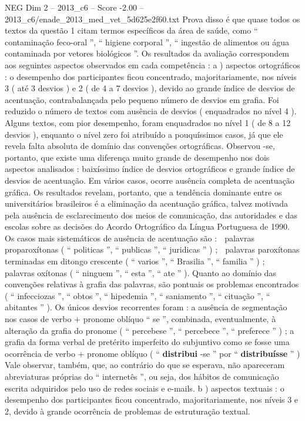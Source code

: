 \begin{textsample}{NEG Dim 2 – 2013\_c6 – Score -2.00 – 2013\_c6/enade\_2013\_med\_vet\_5d625e2f60.txt}
Prova disso é que quase todos os textos da questão 1 citam termos específicos da área de saúde, como “ contaminação feco-oral ”, “ higiene corporal ”, “ ingestão de alimentos ou água contaminada por vetores biológicos ”.
Os resultados da avaliação correspondem aos seguintes aspectos observados em cada competência : a ) aspectos ortográficos : o desempenho dos participantes ficou concentrado, majoritariamente, nos níveis 3 ( até 3 desvios ) e 2 ( de 4 a 7 desvios ), devido ao grande índice de desvios de acentuação, contrabalançada pelo pequeno número de desvios em grafia.
Foi reduzido o número de textos com ausência de desvios ( enquadrados no nível 4 ).
Alguns textos, com pior desempenho, foram enquadrados no nível 1 ( de 8 a 12 desvios ), enquanto o nível zero foi atribuído a pouquíssimos casos, já que ele revela falta absoluta de domínio das convenções ortográficas.
Observou -se, portanto, que existe uma diferença muito grande de desempenho nos dois aspectos analisados : baixíssimo índice de desvios ortográficos e grande índice de desvios de acentuação.
Em vários casos, ocorre ausência completa de acentuação gráfica.
Os resultados revelam, portanto, que a tendência dominante entre os universitários brasileiros é a eliminação da acentuação gráfica, talvez motivada pela ausência de esclarecimento dos meios de comunicação, das autoridades e das escolas sobre as decisões do Acordo Ortográfico da Língua Portuguesa de 1990.
Os casos mais sistemáticos de ausência de acentuação são :  palavras proparoxítonas ( “ politicas ”, “ publicas ”, “ juridicas ” ) ;  palavras paroxítonas terminadas em ditongo crescente ( “ varios ”, “ Brasilia ”, “ familia ” ) ;  palavras oxítonas ( “ ninguem ”, “ esta ”, “ ate ” ).
Quanto ao domínio das convenções relativas à grafia das palavras, são pontuais os problemas encontrados ( “ infecciozas ”, “ obtos ”, “ hipedemia ”, “ saniamento ”, “ cituação ”, “ abitantes ” ).
Os únicos desvios recorrentes foram : a ausência de segmentação nos casos de verbo + pronome oblíquo “ se ”, combinada, eventualmente, à alteração da grafia do pronome ( “ percebese ”, “ percebece ”, “ preferece ” ) ; a grafia da forma verbal de pretérito imperfeito do subjuntivo como se fosse uma ocorrência de verbo + pronome oblíquo ( “ \textbf{distribui} -se ” por “ \textbf{distribuísse} ” ) Vale observar, também, que, ao contrário do que se esperava, não apareceram abreviaturas próprias do “ internetês ”, ou seja, dos hábitos de comunicação escrita adquiridos pelo uso de redes sociais e e-mails. b ) aspectos textuais : o desempenho dos participantes ficou concentrado, majoritariamente, nos níveis 3 e 2, devido à grande ocorrência de problemas de estruturação textual.

\end{textsample}
